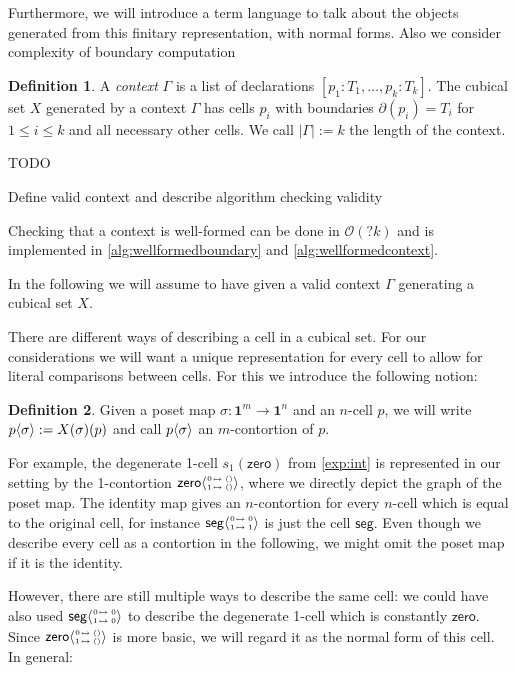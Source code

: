 \documentclass[11pt]{article}
\theoremstyle{definition}
\newtheorem{definition}{Definition}
\newcommand{\todo}[1]{
  \begin{tcolorbox}
    TODO {#1} 
  \end{tcolorbox}
}
\newcommand{\mdef}{:=}
\newcommand{\mname}[1]{\textit{{#1}}}
\newcommand{\mlist}[1]{[ {#1} ]}
\newcommand{\pint}[1]{\mathbf{1}^{#1}}
\newcommand{\ctxtdim}[1]{|{#1}|}
\newcommand{\smap}[1]{s_{{#1}}}
\newcommand{\cont}[2]{ \ifthenelse{\equal{#2}{}}{#1}{{#1}\langle{#2}\rangle} }
\newcommand{\cset}[1]{\mathsf{{#1}}}
\newcommand{\boundary}[1]{\partial({#1})}
\newcommand{\substtwo}[2]{\tiny
  \arraycolsep=.4pt\def\arraystretch{1}
  \begin{array}{ll}
    0 &\mapsto {#1} \\
    1 &\mapsto {#2}
  \end{array}
}
\newcommand{\oneconst}{\substtwo{()}{()}}
\newcommand{\oneid}{\substtwo{0}{1}}
\begin{document}
Furthermore, we will introduce a term language to talk about the objects
generated from this finitary representation, with normal forms. Also we consider
complexity of boundary computation 


\begin{definition}
  A \mname{context} $\Gamma$ is a list of declarations $\mlist{ p_1 : T_1 ,
    \ldots , p_k : T_k}$. The cubical set $X$ generated by a context $\Gamma$
  has cells $p_i$ with boundaries $\boundary{p_i} = T_i$ for $1 \leq i \leq k$
  and all necessary other cells. We call $\ctxtdim{\Gamma} \mdef k$ the length
  of the context.
\end{definition}

\todo{Define valid context and describe algorithm checking validity

  Checking that a context is well-formed can be done in $\mathcal{O}(? k)$ and is
  implemented in \autoref{alg:wellformedboundary} and
  \autoref{alg:wellformedcontext}.
}



In the following we will assume to have given a valid context $\Gamma$
generating a cubical set $X$.

There are different ways of describing a cell in a cubical set. For our
considerations we will want a unique representation for every cell to allow for
literal comparisons between cells. For this we introduce the following notion:

\begin{definition}
  Given a poset map $\sigma : \pint{m} \to \pint{n}$ and an $n$-cell $p$, we
  will write $\cont{p}{\sigma} \mdef X(\sigma)(p)$ and call $\cont{p}{\sigma}$ an
  $m$-contortion of $p$.
\end{definition}

For example, the degenerate 1-cell $\smap{1}(\cset{zero})$ from
\autoref{exp:int} is represented in our setting by the 1-contortion
$\cont{\cset{zero}}{\oneconst}$, where we directly depict the graph of the poset
map. The identity map gives an $n$-contortion for every $n$-cell which is equal
to the original cell, for instance $\cont{\cset{seg}}{\oneid}$ is just the cell
$\cset{seg}$. Even though we describe every cell as a contortion in the
following, we might omit the poset map if it is the identity.

However, there are still multiple ways to describe the same cell: we could
have also used $\cont{\cset{seg}}{\substtwo{0}{0}}$ to describe the degenerate
1-cell which is constantly $\cset{zero}$. Since $\cont{\cset{zero}}{\oneconst}$
is more basic, we will regard it as the normal form of this cell. In general:
\end{document}
